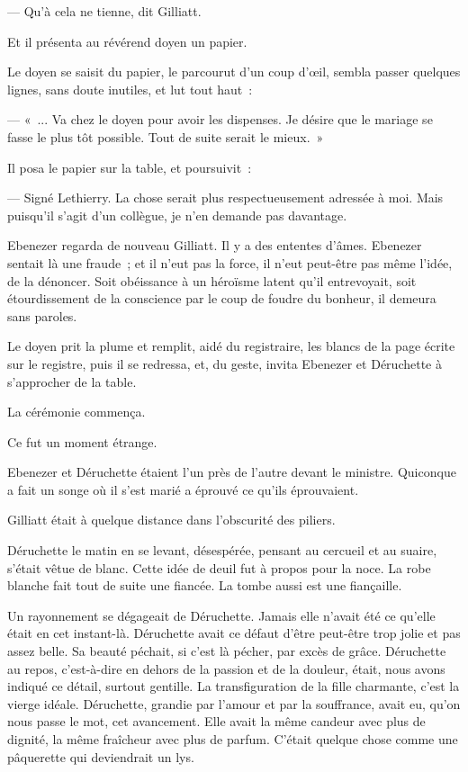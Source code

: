 \documentclass[french,twoside]{book} %
\begin{document}
— Qu’à cela ne tienne, dit Gilliatt.\par
Et il présenta au révérend doyen un papier.\par
Le doyen se saisit du papier, le parcourut d’un coup d’œil, sembla passer quelques lignes, sans doute inutiles, et lut tout haut :\par
— « ... Va chez le doyen pour avoir les dispenses. Je désire que le mariage se fasse le plus tôt possible. Tout de suite serait le mieux. »\par
Il posa le papier sur la table, et poursuivit :\par
— Signé Lethierry. La chose serait plus respectueusement adressée à moi. Mais puisqu’il s’agit d’un collègue, je n’en demande pas davantage.\par
Ebenezer regarda de nouveau Gilliatt. Il y a des ententes d’âmes. Ebenezer sentait là une fraude ; et il n’eut pas la force, il n’eut peut-être pas même l’idée, de la dénoncer. Soit obéissance à un héroïsme latent qu’il entrevoyait, soit étourdissement de la conscience par le coup de foudre du bonheur, il demeura sans paroles.\par
Le doyen prit la plume et remplit, aidé du registraire, les blancs de la page écrite sur le registre, puis il se redressa, et, du geste, invita Ebenezer et Déruchette à s’approcher de la table.\par
 La cérémonie commença.\par
Ce fut un moment étrange.\par
Ebenezer et Déruchette étaient l’un près de l’autre devant le ministre. Quiconque a fait un songe où il s’est marié a éprouvé ce qu’ils éprouvaient.\par
Gilliatt était à quelque distance dans l’obscurité des piliers.\par
Déruchette le matin en se levant, désespérée, pensant au cercueil et au suaire, s’était vêtue de blanc. Cette idée de deuil fut à propos pour la noce. La robe blanche fait tout de suite une fiancée. La tombe aussi est une fiançaille.\par
Un rayonnement se dégageait de Déruchette. Jamais elle n’avait été ce qu’elle était en cet instant-là. Déruchette avait ce défaut d’être peut-être trop jolie et pas assez belle. Sa beauté péchait, si c’est là pécher, par excès de grâce. Déruchette au repos, c’est-à-dire en dehors de la passion et de la douleur, était, nous avons indiqué ce détail, surtout gentille. La transfiguration de la fille charmante, c’est la vierge idéale. Déruchette, grandie par l’amour et par la souffrance, avait eu, qu’on nous passe le mot, cet avancement. Elle avait la même candeur avec plus de dignité, la même fraîcheur avec plus de parfum. C’était quelque chose comme une pâquerette qui deviendrait un lys.\par
\end{document}
